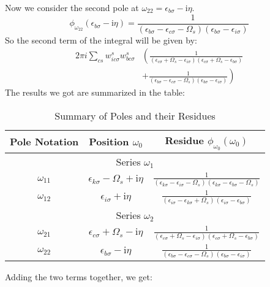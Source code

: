 \documentclass[12pt]{article}
\begin{document}
Now we consider the second pole at $\omega_{22} = \epsilon _{b \sigma } - \mathrm{i} \eta$.
\begin{equation}
\boxed{\phi_{\omega_{22}}(\epsilon_{b \sigma} - \mathrm{i} \eta) = \frac{1}{(\epsilon_{b \sigma} -\epsilon_{c \sigma}-\Omega_s)(\epsilon_{b \sigma} -\epsilon_{i \sigma})}}
\end{equation}
So the second term of the integral will be given by:
\begin{equation}
\begin{aligned}
2\pi i \sum_{cs} w_{i c \sigma}^s w_{b c \sigma}^s & \left( \frac{1}{(\epsilon_{c \sigma} + \Omega_s -\epsilon_{i \sigma})(\epsilon_{c \sigma} + \Omega_s -\epsilon_{b \sigma})} \right. \\
& \left. + \frac{1}{(\epsilon_{b \sigma} -\epsilon_{c \sigma}-\Omega_s)(\epsilon_{b \sigma} -\epsilon_{i \sigma})} \right)
\end{aligned}
\end{equation}
The results we got are summarized in the table:
\begin{table}[h]
\centering
\caption{Summary of Poles and their Residues}
\begin{tabular}{|c|c|c|}
\hline
Pole Notation & Position $\omega_0$ & Residue $\phi_{\omega_0}(\omega_0)$ \\
\hline
\multicolumn{3}{|c|}{Series $\omega_1$} \\
\hline
$\omega_{11}$ & $\epsilon_{k \sigma} - \Omega_s + \mathrm{i} \eta$ & $\frac{1}{(\epsilon_{k \sigma} -\epsilon_{i \sigma}-\Omega_s)(\epsilon_{k \sigma} -\epsilon_{b \sigma}-\Omega_s)}$ \\
$\omega_{12}$ & $\epsilon_{i \sigma} + \mathrm{i} \eta$ & $\frac{1}{(\epsilon_{i \sigma} -\epsilon_{k \sigma}+\Omega_s)(\epsilon_{i \sigma} -\epsilon_{b \sigma})}$ \\
\hline
\multicolumn{3}{|c|}{Series $\omega_2$} \\
\hline
$\omega_{21}$ & $\epsilon_{c \sigma} + \Omega_s - \mathrm{i} \eta$ & $\frac{1}{(\epsilon_{c \sigma} + \Omega_s -\epsilon_{i \sigma})(\epsilon_{c \sigma} + \Omega_s -\epsilon_{b \sigma})}$ \\
$\omega_{22}$ & $\epsilon_{b \sigma} - \mathrm{i} \eta$ & $\frac{1}{(\epsilon_{b \sigma} -\epsilon_{c \sigma}-\Omega_s)(\epsilon_{b \sigma} -\epsilon_{i \sigma})}$ \\
\end{tabular}
\end{table}
Adding the two terms together, we get:
\end{document}
